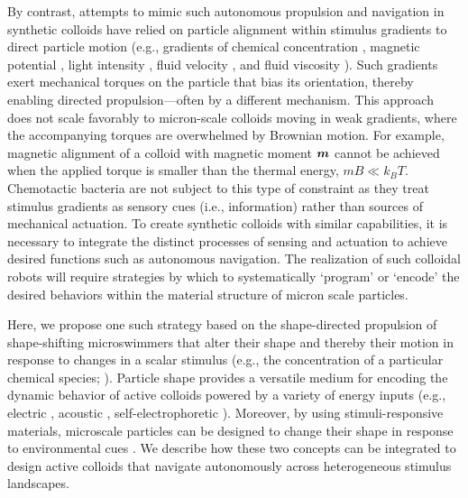 By contrast, attempts to mimic such autonomous propulsion and navigation in synthetic colloids \cite{bechinger2016active} have relied on particle alignment within stimulus gradients to direct particle motion (e.g., gradients of chemical concentration \cite{hong2007chemotaxis,popescu2018chemotaxis}, magnetic potential \cite{Kline2005}, light intensity \cite{lozano2016phototaxis}, fluid velocity \cite{Palacci2015}, and fluid viscosity \cite{liebchen2018viscotaxis}). Such gradients exert mechanical torques on the particle that bias its orientation, thereby enabling directed propulsion---often by a different mechanism. This approach does not scale favorably to micron-scale colloids moving in weak gradients, where the accompanying torques are overwhelmed by Brownian motion. For example, magnetic alignment of a colloid with magnetic moment $\boldsymbol{m}$ cannot be achieved when the applied torque is smaller than the thermal energy, $m B\ll k_B T $. Chemotactic bacteria are not subject to this type of constraint as they treat stimulus gradients as sensory cues (i.e., information) rather than sources of mechanical actuation. To create synthetic colloids with similar capabilities, it is necessary to integrate the distinct processes of sensing and actuation to achieve desired functions such as autonomous navigation. The realization of such colloidal robots \cite{palagi2018bioinspired, han2018engineering} will require strategies by which to systematically `program’ or `encode’ the desired behaviors within the material structure of micron scale particles.

Here, we propose one such strategy based on the shape-directed propulsion of shape-shifting microswimmers that alter their shape and thereby their motion in response to changes in a scalar stimulus (e.g., the concentration of a particular chemical species; ). Particle shape provides a versatile medium for encoding the dynamic behavior of active colloids powered by a variety of energy inputs (e.g., electric \cite{brooks2018shape}, acoustic \cite{sabrina2018shape}, self-electrophoretic \cite{brooks2019shape}). Moreover, by using stimuli-responsive materials, microscale particles can be designed to change their shape in response to environmental cues \cite{magdanz2014stimuli,palagi2016structured}.  We describe how these two concepts can be integrated to design active colloids that navigate autonomously across heterogeneous stimulus landscapes.   

